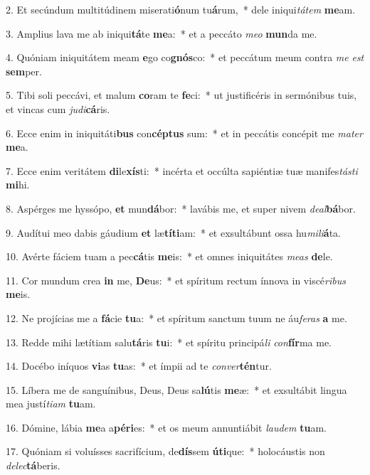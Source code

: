 2. Et secúndum multitúdinem miserati\textbf{ó}num tu\textbf{á}rum,~*  dele iniqui\textit{tá}\textit{tem} \textbf{me}am.\

3. Amplius lava me ab iniqui\textbf{tá}te \textbf{me}a:~*  et a peccáto \textit{me}\textit{o} \textbf{mun}da me.\

4. Quóniam iniquitátem meam \textbf{e}go co\textbf{gnós}co:~*  et peccátum meum contra \textit{me} \textit{est} \textbf{sem}per.\

5. Tibi soli peccávi, et malum \textbf{co}ram te \textbf{fe}ci:~*  ut justificéris in sermónibus tuis, et vincas cum \textit{ju}\textit{di}\textbf{cá}ris.\

6. Ecce enim in iniquitáti\textbf{bus} con\textbf{cép}\textbf{tus} sum:~*  et in peccátis concépit me \textit{ma}\textit{ter} \textbf{me}a.\

7. Ecce enim veritátem \textbf{di}le\textbf{xís}ti:~*  incérta et occúlta sapiéntiæ tuæ manifes\textit{tás}\textit{ti} \textbf{mi}hi.\

8. Aspérges me hyssópo, \textbf{et} mun\textbf{dá}bor:~*  lavábis me, et super nivem \textit{de}\textit{al}\textbf{bá}bor.\

9. Audítui meo dabis gáudium \textbf{et} læ\textbf{tí}\textbf{ti}am:~*  et exsultábunt ossa hu\textit{mi}\textit{li}\textbf{á}ta.\

10. Avérte fáciem tuam a pec\textbf{cá}tis \textbf{me}is:~*  et omnes iniquitátes \textit{me}\textit{as} \textbf{de}le.\

11. Cor mundum crea \textbf{in} me, \textbf{De}us:~*  et spíritum rectum ínnova in viscé\textit{ri}\textit{bus} \textbf{me}is.\

12. Ne projícias me a \textbf{fá}cie \textbf{tu}a:~*  et spíritum sanctum tuum ne áu\textit{fe}\textit{ras} \textbf{a} me.\

13. Redde mihi lætítiam salu\textbf{tá}ris \textbf{tu}i:~*  et spíritu principá\textit{li} \textit{con}\textbf{fír}ma me.\

14. Docébo iníquos \textbf{vi}as \textbf{tu}as:~*  et ímpii ad te \textit{con}\textit{ver}\textbf{tén}tur.\

15. Líbera me de sanguínibus, Deus, Deus sa\textbf{lú}tis \textbf{me}æ:~*  et exsultábit lingua mea justí\textit{ti}\textit{am} \textbf{tu}am.\

16. Dómine, lábia \textbf{me}a a\textbf{pé}\textbf{ri}es:~*  et os meum annuntiábit \textit{lau}\textit{dem} \textbf{tu}am.\

17. Quóniam si voluísses sacrifícium, de\textbf{dís}sem \textbf{ú}\textbf{ti}que:~*  holocáustis non \textit{de}\textit{lec}\textbf{tá}beris.\

